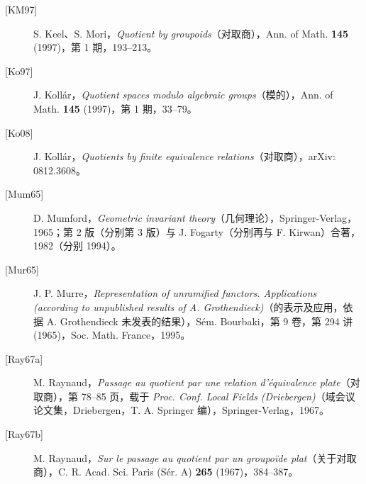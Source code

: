 \begin{description}
\item[{[KM97]}] S. Keel、S. Mori，\textit{Quotient by groupoids}（对取商），Ann. of Math. \textbf{145} (1997)，第 1 期，193--213。
\item[{[Ko97]}] J. Kollár，\textit{Quotient spaces modulo algebraic groups}（模的），Ann. of Math. \textbf{145} (1997)，第 1 期，33--79。
\item[{[Ko08]}] J. Kollár，\textit{Quotients by finite equivalence relations}（对取商），arXiv: 0812.3608。
\item[{[Mum65]}] D. Mumford，\textit{Geometric invariant theory}（几何理论），Springer-Verlag，1965；第 2 版（分别第 3 版）与 J. Fogarty（分别再与 F. Kirwan）合著，1982（分别 1994）。
\item[{[Mur65]}] J. P. Murre，\textit{Representation of unramified functors. Applications (according to unpublished results of A. Grothendieck)}（的表示及应用，依据 A. Grothendieck 未发表的结果），Sém. Bourbaki，第 9 卷，第 294 讲 (1965)，Soc. Math. France，1995。
\item[{[Ray67a]}] M. Raynaud，\textit{Passage au quotient par une relation d'équivalence plate}（对取商），第 78--85 页，载于 \textit{Proc. Conf. Local Fields (Driebergen)}（域会议论文集，Driebergen，T. A. Springer 编），Springer-Verlag，1967。
\item[{[Ray67b]}] M. Raynaud，\textit{Sur le passage au quotient par un groupoïde plat}（关于对取商），C. R. Acad. Sci. Paris (Sér. A) \textbf{265} (1967)，384--387。
\end{description}
